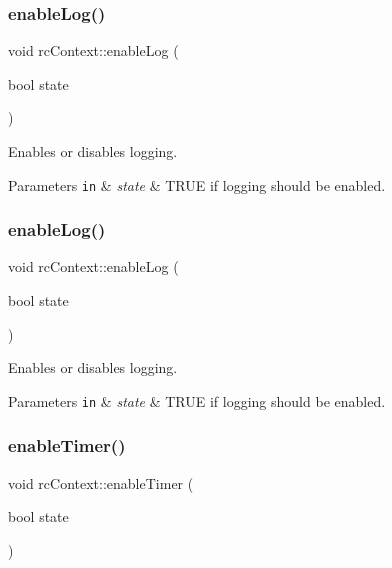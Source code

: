 \subsubsection{\texorpdfstring{enable\+Log()}{enableLog()}\hspace{0.1cm}{\footnotesize\ttfamily [1/2]}}
{\footnotesize\ttfamily void rc\+Context\+::enable\+Log (\begin{DoxyParamCaption}\item[{bool}]{state }\end{DoxyParamCaption})\hspace{0.3cm}{\ttfamily [inline]}}

Enables or disables logging. 
\begin{DoxyParams}[1]{Parameters}
\mbox{\tt in}  & {\em state} & T\+R\+UE if logging should be enabled. \\
\hline
\end{DoxyParams}
\mbox{\label{classrcContext_a03dcf9240dc69a7c329c15e32be12d8e}} 
\subsubsection{\texorpdfstring{enable\+Log()}{enableLog()}\hspace{0.1cm}{\footnotesize\ttfamily [2/2]}}
{\footnotesize\ttfamily void rc\+Context\+::enable\+Log (\begin{DoxyParamCaption}\item[{bool}]{state }\end{DoxyParamCaption})\hspace{0.3cm}{\ttfamily [inline]}}

Enables or disables logging. 
\begin{DoxyParams}[1]{Parameters}
\mbox{\tt in}  & {\em state} & T\+R\+UE if logging should be enabled. \\
\hline
\end{DoxyParams}
\mbox{\label{classrcContext_aa4680430d751824f83634ac753df9669}} 
\subsubsection{\texorpdfstring{enable\+Timer()}{enableTimer()}\hspace{0.1cm}{\footnotesize\ttfamily [1/2]}}
{\footnotesize\ttfamily void rc\+Context\+::enable\+Timer (\begin{DoxyParamCaption}\item[{bool}]{state }\end{DoxyParamCaption})\hspace{0.3cm}{\ttfamily [inline]}}

